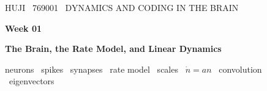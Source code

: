 
\graphicspath{{figures/week01/}}
\renewcommand{\headleft}{769001 \textperiodcentered\ WEEK 01}
\renewcommand{\headright}{DYNAMICS AND CODING IN THE BRAIN}

\newcommand{\Diag}{\operatorname{Diag}}
\providecommand{\norm}[1]{\lVert #1\rVert}
\newcommand{\figcap}[1]{\par\smallskip{\small\color{muted}#1}\par}
\newcommand{\parttitle}[2]{%
  \clearpage
  {\ttfamily\small\color{pgreen}#1}\par\vspace{2pt}
  {\sffamily\bfseries\fontsize{26}{30}\selectfont\color{pgold}#2}\par
  \vspace{4pt}{\color{border}\rule{\linewidth}{1.8pt}}\par\vspace{0.6em}%
  \addtocontents{toc}{\protect\tocpart{#1}}}
\newcommand{\tocpart}[1]{\par\smallskip{\ttfamily\scriptsize\color{pgreen}#1}\par}



{\ttfamily\small\color{pgreen}HUJI \textperiodcentered\ 769001 \textperiodcentered\ DYNAMICS AND CODING IN THE BRAIN}\par\vspace{6pt}
{\sffamily\bfseries\fontsize{30}{34}\selectfont\color{pgold}Week 01}\par\vspace{4pt}
{\sffamily\bfseries\Large\color{pgold}The Brain, the Rate Model, and Linear Dynamics}\par\vspace{4pt}
{\ttfamily\small\color{pcyan}neurons \textperiodcentered\ spikes \textperiodcentered\ synapses \textperiodcentered\ rate model \textperiodcentered\ scales \textperiodcentered\ $\dot n=an$ \textperiodcentered\ convolution \textperiodcentered\ eigenvectors}\par


